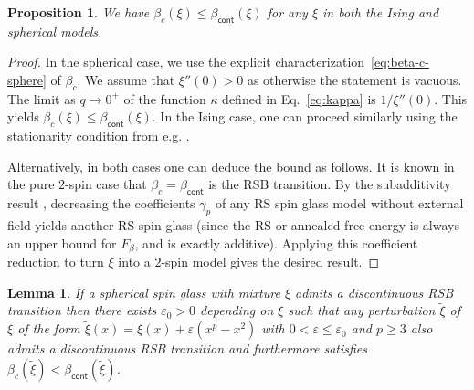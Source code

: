 \documentclass[11pt]{article}
\newtheorem{lemma}[theorem]{Lemma}
\newtheorem{proposition}[theorem]{Proposition}
\theoremstyle{definition}
\numberwithin{equation}{section}
\newcommand{\<}{\langle}
\renewcommand{\>}{\rangle}
\def\eps{\varepsilon}
\def\cont{{\mathsf{cont}}}
\begin{document}
\begin{proposition}\label{prop:beta-cont-bound}
We have $\beta_c(\xi) \le \beta_{\cont}(\xi)$ for any $\xi$ in both the Ising and spherical models.
\end{proposition}

\begin{proof}
    In the spherical case, we use the explicit characterization~\eqref{eq:beta-c-sphere} of $\beta_c$.
    We assume that $\xi''(0)>0$ as otherwise the statement is vacuous. 
    The limit as $q \to 0^+$ of the function $\kappa$ defined in Eq.~\eqref{eq:kappa} is $1/\xi''(0)$. This yields $\beta_c(\xi) \le \beta_{\cont}(\xi)$.
    In the Ising case, one can proceed similarly using the stationarity condition from e.g. \cite[Theorem 2]{chen2017variational}.

    Alternatively, in both cases one can deduce the bound as follows. 
    It is known in the pure $2$-spin case that $\beta_c=\beta_{\cont}$ is the RSB transition.
    By the subadditivity result \cite[Corollary 2.1]{sellke2022free}, decreasing the coefficients $\gamma_p$ of any RS spin glass model without external field yields another RS spin glass (since the RS or annealed free energy is always an upper bound for $F_{\beta}$, and is exactly additive).
    Applying this coefficient reduction to turn $\xi$ into a $2$-spin model gives the desired result.
    \end{proof}


\begin{lemma}\label{lem:beta_order}  
If a spherical spin glass with mixture $\xi$ admits a discontinuous RSB transition then there exists $\eps_0>0$ depending on $\xi$ such that any perturbation $\tilde{\xi}$ of $\xi$ of the form $\tilde{\xi}(x) = \xi(x) + \eps( x^p - x^2)$ with $0<\eps \le \eps_0$ and $p \ge 3$ also admits a discontinuous RSB transition and furthermore satisfies $\beta_c(\tilde{\xi}) < \beta_\cont(\tilde{\xi})$.
\end{lemma}
\end{document}
